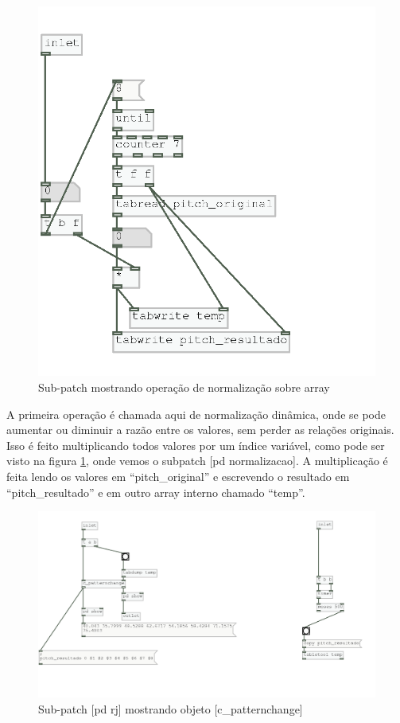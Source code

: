 \documentclass[draft]{ppgmus}
\begin{document}
\begin{figure}
\includegraphics[scale=.6]{variacao-normalizacao}
\caption{Sub-patch mostrando operação de normalização sobre array}
\label{variacoes-normalizacao}
\end{figure}  

A primeira operação é chamada aqui de normalização dinâmica, onde
se pode aumentar ou diminuir a razão entre os valores, sem perder
as relações originais. Isso é feito multiplicando todos valores por
um índice variável, como pode ser visto na figura \ref{variacoes-normalizacao},
onde vemos o subpatch [pd normalizacao]. A multiplicação é feita lendo
os valores em ``pitch\_original'' e escrevendo o resultado em ``pitch\_resultado'' e 
em outro array interno chamado ``temp''.



\begin{figure}
\includegraphics[scale=.6]{variacoes-interno}
\caption{Sub-patch [pd rj] mostrando objeto [c\_patternchange]}
\label{variacoes-interno}
\end{figure}  
\end{document}
